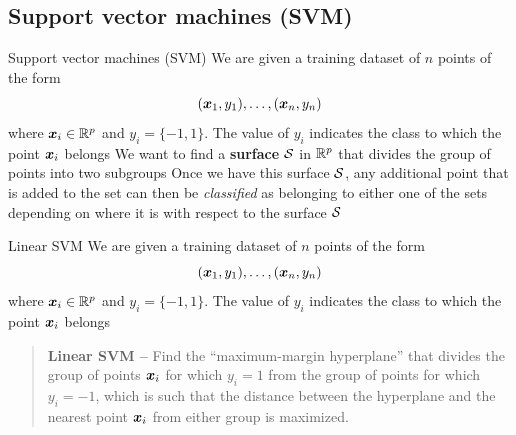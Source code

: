 \documentclass[aspectratio=169]{beamer}\usepackage[]{graphicx}\usepackage[]{xcolor}
\begin{document}
\subsection{Support vector machines (SVM)}

\begin{frame}{Support vector machines (SVM)}
    We are given a training dataset of $n$ points of the form
    \[ 
        (\bx_1, y_1), \ldots, (\bx_n, y_n)
    \]
    where $\bx_i\in\IR^p$ and $y_i=\{-1,1\}$. The value of $y_i$ indicates the class to which the point $\bx_i $ belongs
    \vfill
    We want to find a \textbf{surface} $\S$ in $\IR^p$ that divides the group of points into two subgroups
    \vfill
    Once we have this surface $\S$, any additional point that is added to the set can then be \emph{classified} as belonging to either one of the sets depending on where it is with respect to the surface $\S$
\end{frame}

\begin{frame}{Linear SVM}
    We are given a training dataset of $n$ points of the form
    \[ 
        (\bx_1, y_1), \ldots, (\bx_n, y_n)
    \]
    where $\bx_i\in\IR^p$ and $y_i=\{-1,1\}$. The value of $y_i$ indicates the class to which the point $\bx_i $ belongs
    \vfill
    \begin{quote}\textbf{Linear SVM --}
        Find the ``maximum-margin hyperplane'' that divides the group of points $\bx_i$ for which $y_i = 1$ from the group of points for which $y_i = -1$, which is such that the distance between the hyperplane and the nearest point $\bx_i$ from either group is maximized.
    \end{quote}
\end{frame}
\end{document}
